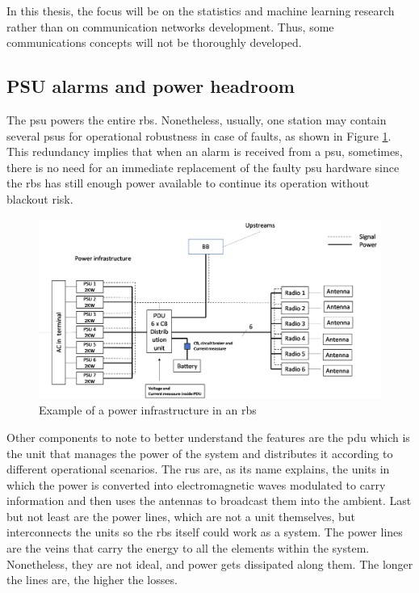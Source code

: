 In this thesis, the focus will be on the statistics and machine learning research rather than on communication networks development. Thus, some communications concepts will not be thoroughly developed.

\subsection{PSU alarms and power headroom}

The \acf{psu} powers the entire \ac{rbs}. Nonetheless, usually, one station may contain several \acp{psu} for operational robustness in case of faults, as shown in Figure \ref{fig:powerinfrastucture}. This redundancy implies that when an alarm is received from a \ac{psu}, sometimes, there is no need for an immediate replacement of the faulty \ac{psu} hardware since the \ac{rbs} has still enough power available to continue its operation without blackout risk. 

\begin{figure}[H]
	\centering
	\includegraphics[width=0.95\linewidth]{figures/power_infrastucture}
	\caption[Example of a power infrastructure in an \ac{rbs}]{Example of a power infrastructure in an \ac{rbs}\protect\footnotemark}
	\label{fig:powerinfrastucture}
\end{figure}


Other components to note to better understand the features are the \ac{pdu} which is the unit that manages the power of the system and distributes it according to different operational scenarios. The \acp{ru} are, as its name explains, the units in which the power is converted into electromagnetic waves modulated to carry information and then uses the antennas to broadcast them into the ambient. Last but not least are the power lines, which are not a unit themselves, but interconnects the units so the \ac{rbs} itself could work as a system. The power lines are the veins that carry the energy to all the elements within the system. Nonetheless, they are not ideal, and power gets dissipated along them. The longer the lines are, the higher the losses.


